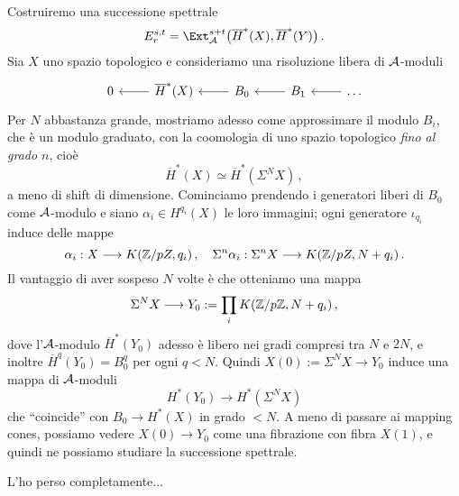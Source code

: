 Costruiremo una successione spettrale
\begin{equation*}
	E_{r}^{s,t} = \Ext_{\Aa}^{s+t}\big( \overline{H}^{*}(X), \overline{H}^{*}(Y) \big)\,.
\end{equation*}
Sia $X$ uno spazio topologico e consideriamo una risoluzione libera di $\mathcal{A}$-moduli
\begin{equation*}
	\begin{tikzcd}
		0 
		& \ar[l] \overline{H}^{*}(X) 
		& \ar[l] B_{0} 
		& \ar[l] B_{1}
		& \ar[l] \dots
	\end{tikzcd}
\end{equation*}
Per $N$ abbastanza grande, mostriamo adesso come approssimare il modulo $B_{i}$,
che è un modulo graduato, con la coomologia di uno spazio topologico
\emph{fino al grado $n$}, cioè
\begin{equation*}
	\overline{H}^{*}(X) \simeq \overline{H}^{*}(\Sigma^{N}X)\,,
\end{equation*}
a meno di shift di dimensione.
Cominciamo prendendo i generatori liberi di $B_{0}$ come $\mathcal{A}$-modulo
e siano $\alpha_{i} \in H^{q_{i}}(X)$ le loro immagini;
ogni generatore $\iota_{q_{i}}$ induce delle mappe
\begin{equation*}
	\alpha_{i} : X \longrightarrow K({\mathbb Z}/pZ, q_{i})\,, \quad
	\Sigma^{n}\alpha_{i} : \Sigma^{n} X \longrightarrow K({\mathbb Z}/pZ, N+q_{i})\,.
\end{equation*}
Il vantaggio di aver sospeso $N$ volte è che otteniamo una mappa
\begin{equation*}
	\Sigma^{N} X \longrightarrow Y_{0} := \prod_{i} K({\mathbb Z}/p{\mathbb Z}, N + q_{i})\,,
\end{equation*}
dove l'$\mathcal{A}$-modulo $\overline{H}^{*}(Y_{0})$ adesso
è libero nei gradi compresi tra $N$ e $2N$,
e inoltre $\overline{H}^{q}(Y_{0}) = B_{0}^{q}$ per ogni $q < N$.
Quindi $X(0) := \Sigma^{N}X \to Y_{0}$ induce una mappa di $\mathcal{A}$-moduli
\begin{equation*}
	H^{*}(Y_{0}) \longrightarrow H^{*}(\Sigma^{N}X)
\end{equation*}
che ``coincide'' con $B_{0} \to H^{*}(X)$ in grado $< N$.
A meno di passare ai mapping cones, possiamo vedere $X(0) \to Y_{0}$
come una fibrazione con fibra $X(1)$, e quindi ne possiamo studiare la successione spettrale.

L'ho perso completamente...